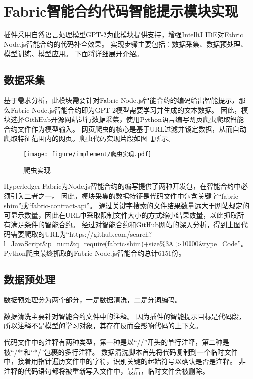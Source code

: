 \section{Fabric智能合约代码智能提示模块实现}

插件采用自然语言处理模型GPT-2为此模块提供支持，增强IntelliJ IDE对Fabric Node.js智能合约的代码补全效果。
实现步骤主要包括：数据采集、数据预处理、模型训练、模型应用。
下面将详细展开介绍。

\subsection{数据采集}

基于需求分析，此模块需要针对Fabric Node.js智能合约的编码给出智能提示，那么Fabric Node.js智能合约即为GPT-2模型需要学习并生成的文本数据。
因此，模块选择GithHub开源网站进行数据采集，使用Python语言编写网页爬虫爬取智能合约文件作为模型输入。
网页爬虫的核心是基于URL过滤并锁定数据，从而自动爬取特征范围内的网页。爬虫代码实现片段如图~\ref{fig:5.6}所示。

\begin{figure}[htb]
  \centering
  \texttt{[image: figure/implement/爬虫实现.pdf]}
  \caption{爬虫实现}\label{fig:5.6}
\end{figure}

Hyperledger Fabric为Node.js智能合约的编写提供了两种开发包，在智能合约中必须引入二者之一。
因此，模块采集的数据特征是代码文件中包含关键字“fabric-shim”或“fabric-contract-api”。
通过关键字搜索的文件结果数量远大于网站规定的可显示数量，因此在URL中采取限制文件大小的方式缩小结果数量，以此抓取所有满足条件的智能合约。
经过对智能合约和GitHub网站的深入分析，得到上图代码需要爬取的URL为“https://github.com/search?l=JavaScript\&p=num\&q=require(fabric-shim)+size\%3A \linebreak >10000\&type=Code”。
Python爬虫最终抓取的Fabric Node.js智能合约总计6151份。

\subsection{数据预处理}

数据预处理分为两个部分，一是数据清洗，二是分词编码。

数据清洗主要针对智能合约文件中的注释。
因为插件的智能提示目标是代码段，所以注释不是模型的学习对象，其存在反而会影响代码的上下文。

代码文件中的注释有两种类型，第一种是以“//”开头的单行注释，第二种是被“/*”和“*/”包裹的多行注释。
数据清洗脚本首先将代码复制到一个临时文件中，接着用指针遍历文件中的字符，识别关键的起始符号以确认是否是注释。
非注释的代码语句都将被重新写入文件中，最后，临时文件会被删除。


